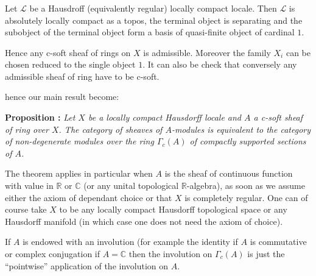 \documentclass[a4paper]{article}
\newcommand{\Lcal}{\mathcal{L}}
\newcommand{\block}[1]
{

\par \subsubsection{} #1

\bigskip}
\newcommand{\Prop}[1]
	{

	\bigskip
	
	\textbf{Proposition : }{\itshape #1}
		
	\bigskip
	
	}
\begin{document}
\block{Let $\Lcal$ be a Hausdroff (equivalently regular) locally compact locale. Then $\Lcal$ is absolutely locally compact as a topos, the terminal object is separating and the subobject of the terminal object form a basis of quasi-finite object of cardinal $1$.

Hence any c-soft sheaf of rings on $X$ is admissible. Moreover the family $X_i$ can be chosen reduced to the single object $1$. It can also be check that conversely any admissible sheaf of ring have to be c-soft.

hence our main result become:

\Prop{Let $X$ be a locally compact Hausdorff locale and $A$ a c-soft sheaf of ring over $X$. The category of sheaves of $A$-modules is equivalent to the category of non-degenerate modules over the ring $\Gamma_c(A)$ of compactly supported sections of $A$.}

The theorem applies in particular when $A$ is the sheaf of continuous function with value in $\mathbb{R}$ or $\mathbb{C}$ (or any unital topological $\mathbb{R}$-algebra), as soon as we assume either the axiom of dependant choice or that $X$ is completely regular. One can of course take $X$ to be any locally compact Hausdorff topological space or any Hausdorff manifold (in which case one does not need the axiom of choice).

If $A$ is endowed with an involution (for example the identity if $A$ is commutative or complex conjugation if $A = \mathbb{C}$ then the involution on $\Gamma_c(A)$ is just the ``pointwise'' application of the involution on $A$.

}
\end{document}

